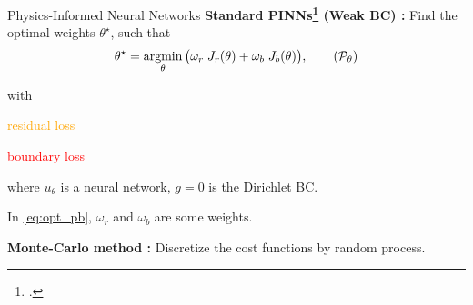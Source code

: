 
\begin{subappendixframe}{Physics-Informed Neural Networks}
	\textbf{Standard PINNs\footcite{RAISSI2019686} (Weak BC) :} Find the optimal weights $\theta^\star$, such that
	\begin{equation}
		\label{eq:opt_pb}
		\theta^\star = \argmin_{\theta}	\big( \omega_r \; J_r(\theta) + \omega_b \; J_b(\theta) \big),
		\tag{$\mathcal{P}_\theta$}
	\end{equation}

	\vspace{-5pt}
	with
	\vspace{5pt}

	\begin{minipage}{0.2\linewidth}
		\flushright
		\textcolor{orange}{residual loss}

		\vspace{12pt}
		\textcolor{red}{boundary loss}
	\end{minipage}
	\begin{minipage}{0.68\linewidth}
		\centering
		
		\vspace{3pt}
	\end{minipage}
	
	\vspace{5pt}
	where $u_\theta$ is a neural network, $g=0$ is the Dirichlet BC. 

	\vspace{2pt}
	In \eqref{eq:opt_pb}, $\omega_r$ and $\omega_b$ are some weights.

	\vspace{5pt}
	\textbf{Monte-Carlo method :} Discretize the cost functions by random process.
	\vspace{15pt}
\end{subappendixframe}

